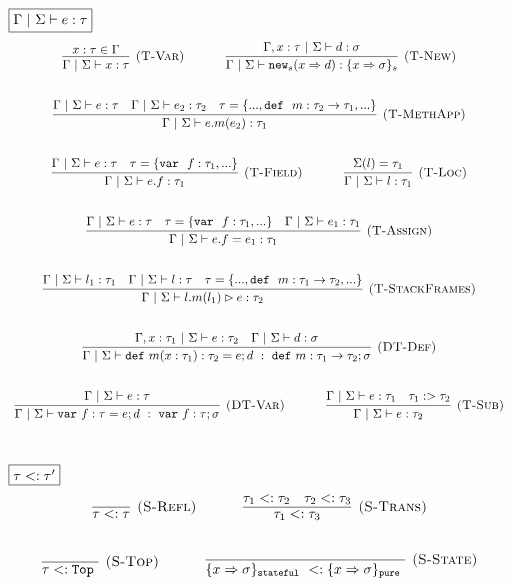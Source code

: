 \documentclass{llncs}
\newcommand{\keywadj}[1]{\mathtt{#1}}
\newcommand{\keyw}[1]{\keywadj{#1}~}
\begin{document}
$\fbox{$\Gamma~|~\Sigma \vdash e : \tau$}$
\[
\begin{array}{c}
\infer[\textsc{(T-Var)}]
  {\Gamma~|~\Sigma \vdash x : \tau}
  {x : \tau \in \Gamma}%
~~~~~~~~~~
\infer[\textsc{(T-New)}]
	{\Gamma~|~\Sigma \vdash\keywadj{new}_{s}(x \Rightarrow d) : \{ x \Rightarrow \sigma \}_{s}}
	{\Gamma, x : \tau~|~\Sigma \vdash d : \sigma} \\[5ex]

\infer[\textsc{(T-MethApp)}]
	{\Gamma~|~\Sigma \vdash  e.m(e_2) : \tau_1} 
	{\Gamma~|~\Sigma \vdash e : \tau & \Gamma~|~\Sigma \vdash e_2 : \tau_2 & \tau=\{..., \keyw{def}~ m : \tau_2 \rightarrow \tau_1, ... \} }\\[5ex]

\infer[\textsc{(T-Field)}]
	{\Gamma~|~\Sigma \vdash  e.f : \tau_1} 
	{\Gamma~|~\Sigma \vdash e : \tau & \tau= \{\keyw{var}~ f : \tau_1,... \} }%
~~~~~~~~~~
\infer[\textsc{(T-Loc)}]
  {\Gamma~|~\Sigma \vdash l : \tau_1}
  {\Sigma(l) = \tau_1}\\[5ex]

\infer[\textsc{(T-Assign)}]
	{\Gamma~|~\Sigma \vdash  e.f=e_1 : \tau_1} 
	{\Gamma~|~\Sigma \vdash e : \tau & \tau = \{\keyw{var}~ f:\tau_1,... \} & \Gamma~|~\Sigma \vdash e_1 : \tau_1 }\\[5ex]

\infer[\textsc{(T-StackFrames)}]
	{\Gamma~|~\Sigma \vdash l.m(l_1) \rhd e : \tau_2}
	{\Gamma~|~\Sigma \vdash l_1 : \tau_1 & \Gamma~|~\Sigma \vdash l : \tau & \tau = \{..., \keyw{def}~ m : \tau_1 \rightarrow \tau_2, ... \}} \\[5ex]

\infer[\textsc{(DT-Def)}]
  {\Gamma~|~\Sigma \vdash \keyw{def} m(x : \tau_1) : \tau_2 = e; d~:~\keyw{def} m : \tau_1 \rightarrow \tau_2; \sigma}
  {\Gamma, x : \tau_1~|~\Sigma \vdash e : \tau_2 & \Gamma~|~\Sigma \vdash d : \sigma}\\[5ex]

\infer[\textsc{(DT-Var)}]
  {\Gamma~|~\Sigma \vdash \keyw{var} f : \tau = e; d~:~\keyw{var} f : \tau; \sigma}
  {\Gamma~|~\Sigma \vdash e : \tau}%
~~~~~~~~~~
\infer[\textsc{(T-Sub)}]
  {\Gamma~|~\Sigma \vdash e : \tau_2}
  {\Gamma~|~\Sigma \vdash e : \tau_1 & \tau_1 :> \tau_2}\\[5ex]

\end{array}
\]

$\fbox{$\tau <: \tau'$}$
\[
\begin{array}{c}
\infer[\textsc{(S-Refl)}]
  {\tau <: \tau}
  {}%
~~~~~~~~~~
\infer[\textsc{(S-Trans)}]
  {\tau_1 <: \tau_3}
  {\tau_1 <: \tau_2 & \tau_2 <: \tau_3}\\[5ex]

\infer[\textsc{(S-Top)}]
  {\tau <: \keyw{Top}}
  {}%
~~~~~~~~~~
\infer[\textsc{(S-State)}]
  {\{ x \Rightarrow \sigma \}_{\keyw{stateful}} <: \{ x \Rightarrow \sigma \}_{\keyw{pure}}}
  {}\\[5ex]  

\end{array}
\]
\end{document}
